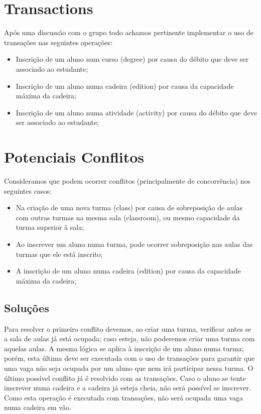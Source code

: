 \documentclass[a4paper, 11pt]{article}
\begin{document}
\section{Transactions}
  Após uma discussão com o grupo todo achamos pertinente implementar o uso de transações nas seguintes operações: 

\begin{itemize}
  \item Inscrição de um aluno num curso (degree) por causa do débito que deve ser associado ao estudante;  
  \item Inscrição de um aluno numa cadeira (edition) por causa da capacidade máxima da cadeira; 
  \item Inscrição de um aluno numa atividade (activity) por causa do débito que deve ser associado ao estudante; 
\end{itemize}
  
\section{Potenciais Conflitos}
  Consideramos que podem ocorrer conflitos (principalmente de concorrência) nos seguintes casos:

\begin{itemize}
  \item Na criação de uma nova turma (class) por causa de sobreposição de aulas com outras turmas na mesma sala (classroom), ou mesmo capacidade da turma superior à sala;
  \item Ao inscrever um aluno numa turma, pode ocorrer sobreposição nas aulas das turmas que ele está inscrito; 
  \item A inscrição de um aluno numa cadeira (edition) por causa da capacidade máxima da cadeira;
\end{itemize}

\subsection{Soluções}

Para resolver o primeiro conflito devemos, ao criar uma turma, verificar antes se a sala de aulas já está ocupada; caso esteja, não poderemos criar uma turma com aquelas aulas. A mesma lógica se aplica à inscrição de um aluno numa turma; porém, esta última deve ser executada com o uso de transações para garantir que uma vaga não seja ocupada por um aluno que nem irá participar nessa turma.
O último possível conflito já é resolvido com as transações. Caso o aluno se tente inscrever numa cadeira e a cadeira já esteja cheia, não será possível se inscrever. Como esta operação é executada com transações, não será ocupada uma vaga numa cadeira em vão.
\end{document}
